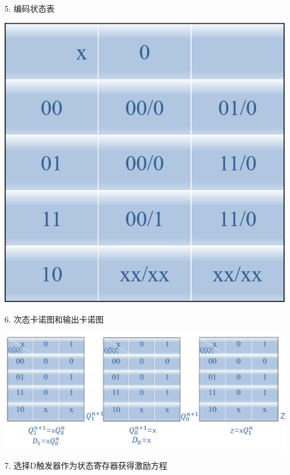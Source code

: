 \documentclass[UTF8]{ctexart}
\begin{document}
\begin{enumerate}
\begin{itemize}
\begin{center}
                    \end{center}
              \item [5.] 编码状态表              \\
                    \begin{center}
                        \includegraphics[scale = 0.6]{5.png}
                    \end{center}
              \item [6.] 次态卡诺图和输出卡诺图            \\
                    \begin{center}
                        \includegraphics[scale = 0.6]{6.png}
                    \end{center}
              \item [7.] 选择D触发器作为状态寄存器获得激励方程

\end{itemize}
\end{enumerate}
\end{document}
